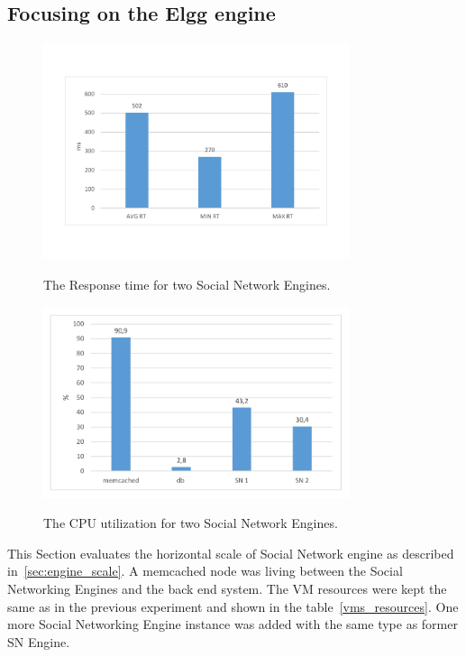 \subsection{Focusing on the Elgg engine}

\begin{figure}[h]
	\caption{The Response time for two Social Network Engines.}
	\includegraphics[width=0.8\textwidth,natwidth=200,natheight=150]{./fig/RT2SN.pdf}
	\centering
	\label{fig:rt2SN}
\end{figure}

\begin{figure}[h]
	\caption{The CPU utilization for two Social Network Engines.}
	\includegraphics[width=0.8\textwidth,natwidth=200,natheight=150]{./fig/Usage2SN.pdf}
	\centering
	\label{fig:cpu2SNavg}
\end{figure}

This Section evaluates the horizontal scale of Social Network engine as described in~\ref{sec:engine_scale}. A memcached node was living between the Social Networking Engines and the back end system. The VM resources were kept the same as in the previous experiment and shown in the table~\ref{vms_resources}. One more Social Networking Engine instance was added with the same type as former SN Engine. 

